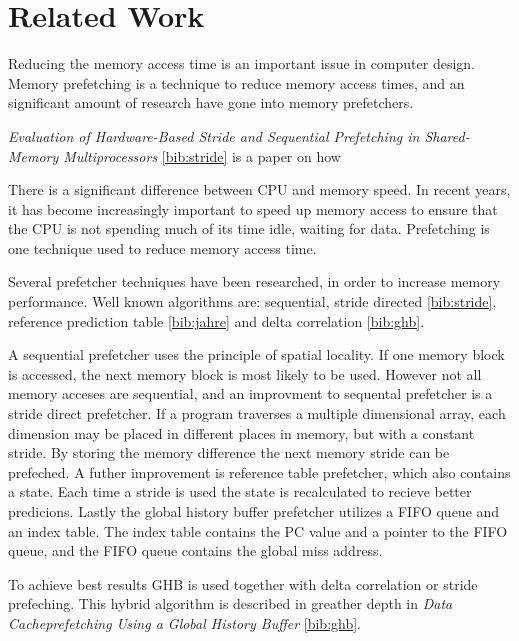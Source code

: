 \section{Related Work}
\label{sec:related-work}

Reducing the memory access time is an important issue in computer design.
Memory prefetching is a technique to reduce memory access times,
and an significant amount of research have gone into memory prefetchers.

\textit{Evaluation of Hardware-Based Stride and Sequential Prefetching in Shared-Memory Multiprocessors} \ref{bib:stride}
is a paper on how 


There is a significant difference between CPU and memory speed.
In recent years, it has become increasingly important to speed up memory access to ensure that the CPU is not spending much of its time idle, waiting for data.
Prefetching is one technique used to reduce memory access time.

Several prefetcher techniques have been researched, in order to increase memory performance.
Well known algorithms are: sequential, stride directed \ref{bib:stride}, reference prediction table \ref{bib:jahre} and delta correlation \ref{bib:ghb}.

A sequential prefetcher uses the principle of spatial locality.
If one memory block is accessed, the next memory block is most likely to be used.
However not all memory acceses are sequential,
and an improvment to sequental prefetcher is a stride direct prefetcher.
If a program traverses a multiple dimensional array,
each dimension may be placed in different places in memory,
but with a constant stride.
By storing the memory difference the next memory stride can be prefeched.
A futher improvement is reference table prefetcher,
which also contains a state.
Each time a stride is used the state is recalculated to recieve better predicions.
Lastly the global history buffer prefetcher utilizes a FIFO queue and an index table.
The index table contains the PC value and a pointer to the FIFO queue,
and the FIFO queue contains the global miss address.

To achieve best results GHB is used together with delta correlation or stride prefeching.
This hybrid algorithm is described in greather depth in \textit{Data Cacheprefetching Using a Global History Buffer} \ref{bib:ghb}.
